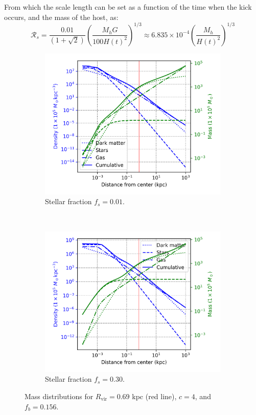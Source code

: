 			From which the scale length can be set as a function of the time when the kick occurs, and the mass of the host, as:
			\begin{equation}
				\mathcal{R}_s = \dfrac{0.01}{\left(1 + \sqrt{2}\right)}\left({\dfrac{M_hG}{100 H(t)^2}}\right)^{1/3} \approx 6.835\times 10^{-4}\left({\dfrac{M_h}{H(t)^2}}\right)^{1/3}
			\end{equation}
			\begin{figure}[h]
				\centering
				\begin{subfigure}[b]{0.49\textwidth}
					\includegraphics[width=\textwidth]{"../Files/Week 6/density_mass_fs01"}
					\caption{Stellar fraction $f_s = 0.01$.}
					\label{fig: baryonicprofilehigh}
				\end{subfigure}
				~ 
				\begin{subfigure}[b]{0.49\textwidth}
					\includegraphics[width=\textwidth]{"../Files/Week 6/density_mass_fs3"}
					\caption{Stellar fraction $f_s = 0.30$.}
					\label{fig: baryonicprofilelow}
				\end{subfigure}
				\caption{Mass distributions for $R_\text{vir} = 0.69$ kpc (red line), $c = 4$, and $f_b = 0.156$.}
				\label{fig: massprofiles}
			\end{figure}
	
